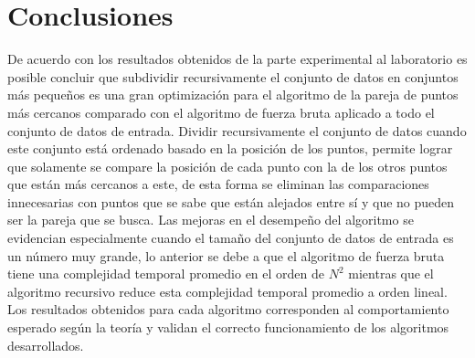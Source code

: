 \section{Conclusiones}

De acuerdo con los resultados obtenidos de la parte experimental al laboratorio es posible concluir que subdividir recursivamente el conjunto de datos en conjuntos más pequeños es una gran optimización para el algoritmo de la pareja de puntos más cercanos comparado con el algoritmo de fuerza bruta aplicado a todo el conjunto de datos de entrada. Dividir recursivamente el conjunto de datos cuando este conjunto está ordenado basado en la posición de los puntos, permite lograr que solamente se compare la posición de cada punto con la de los otros puntos que están más cercanos a este, de esta forma se eliminan las comparaciones innecesarias con puntos que se sabe que están alejados entre sí y que no pueden ser la pareja que se busca. Las mejoras en el desempeño del algoritmo se evidencian especialmente cuando el tamaño del conjunto de datos de entrada es un número muy grande, lo anterior se debe a que el algoritmo de fuerza bruta tiene una complejidad temporal promedio en el orden de $N^2$ mientras que el algoritmo recursivo reduce esta complejidad temporal promedio a orden lineal. Los resultados obtenidos para cada algoritmo corresponden al comportamiento esperado según la teoría y validan el correcto funcionamiento de los algoritmos desarrollados.